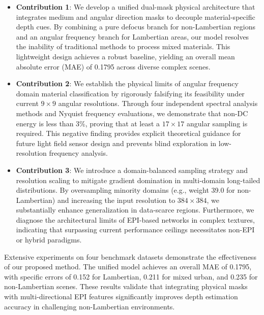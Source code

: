 \begin{itemize}
  \item \textbf{Contribution 1}: We develop a unified dual-mask physical architecture that integrates medium and angular direction masks to decouple material-specific depth cues. By combining a pure defocus branch for non-Lambertian regions and an angular frequency branch for Lambertian areas, our model resolves the inability of traditional methods to process mixed materials. This lightweight design achieves a robust baseline, yielding an overall mean absolute error (MAE) of 0.1795 across diverse complex scenes.
  \item \textbf{Contribution 2}: We establish the physical limits of angular frequency domain material classification by rigorously falsifying its feasibility under current $9 \times 9$ angular resolutions. Through four independent spectral analysis methods and Nyquist frequency evaluations, we demonstrate that non-DC energy is less than 3\%, proving that at least a $17 \times 17$ angular sampling is required. This negative finding provides explicit theoretical guidance for future light field sensor design and prevents blind exploration in low-resolution frequency analysis.
  \item \textbf{Contribution 3}: We introduce a domain-balanced sampling strategy and resolution scaling to mitigate gradient domination in multi-domain long-tailed distributions. By oversampling minority domains (e.g., weight 39.0 for non-Lambertian) and increasing the input resolution to $384 \times 384$, we substantially enhance generalization in data-scarce regions. Furthermore, we diagnose the architectural limits of EPI-based networks in complex textures, indicating that surpassing current performance ceilings necessitates non-EPI or hybrid paradigms.
\end{itemize}
Extensive experiments on four benchmark datasets demonstrate the effectiveness of our proposed method. The unified model achieves an overall MAE of 0.1795, with specific errors of 0.152 for Lambertian, 0.211 for mixed urban, and 0.235 for non-Lambertian scenes. These results validate that integrating physical masks with multi-directional EPI features significantly improves depth estimation accuracy in challenging non-Lambertian environments.